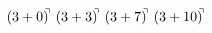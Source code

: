 \documentclass[preview]{standalone}
\begin{document}
\begin{align*}
(3+0)^{\hspace{-0.1cm}\urcorner} \ (3+3)^{\hspace{-0.1cm}\urcorner} \ (3+7)^{\hspace{-0.1cm}\urcorner} \ (3+10)^{\hspace{-0.1cm}\urcorner}
\end{align*}
\end{document}
